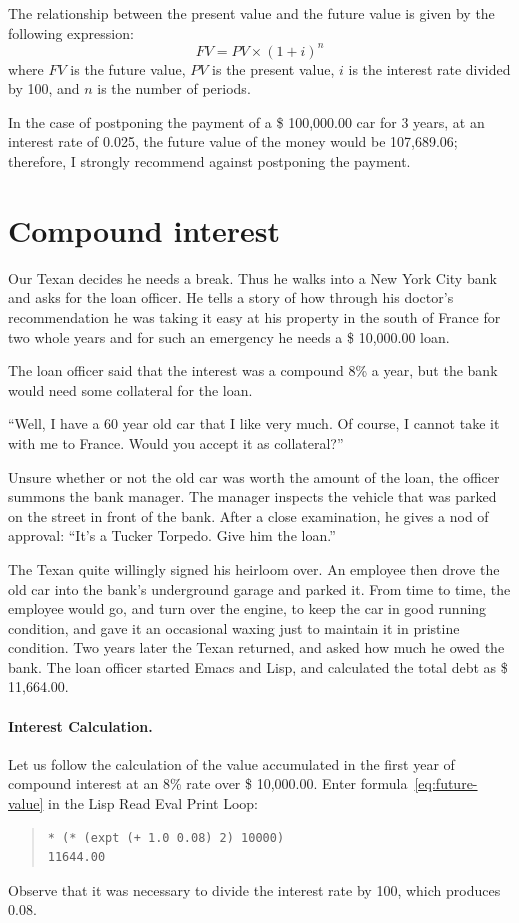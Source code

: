 \documentclass[a4paper,12pt]{book}
\begin{document}
The relationship between the present value
and the future value is given by the
following expression:
\begin{equation}
FV= PV\times (1+i)^n
\label{eq:future-value}
\end{equation}
where $FV$ is the future value, $PV$ is the present
value, $i$ is the interest rate divided by 100,
and $n$ is the number of periods.

In the case of postponing the payment of a \$ 100,000.00 car
for 3 years, at an interest rate of 0.025, the future
value of the money would be 107,689.06; therefore,
I strongly recommend against postponing the payment.

\section{Compound interest}

Our Texan decides he needs a break. Thus he walks into
a New York City bank and asks for the loan officer.
He tells a story of how through his doctor's recommendation
he was taking it easy at his property in the south of
France for two whole years and for such an 
emergency he needs a \$ 10,000.00 loan.

The loan officer said that the interest was a compound 8\%
a year, but the bank would need some collateral for the loan.

“Well, I have a 60 year old car that I like very much.
Of course, I cannot take it with me to France.
Would you accept it as collateral?”

Unsure whether or not the old car was worth the
amount of the loan, the officer summons the bank manager.
The manager inspects the vehicle that was parked on the
street in front of the bank. After a close examination,
he gives a nod of approval: “It’s a Tucker Torpedo.
Give him the loan.”

The Texan quite willingly signed his heirloom over.
An employee then drove the old car into the bank’s
underground garage and parked it. From time to time,
the employee would go, and turn over the engine, to keep
the car in good running condition, and gave it an
occasional waxing just to maintain it in pristine condition.
Two years later the Texan returned, and asked how
much he owed the bank. The loan officer started Emacs and
Lisp, and calculated the total debt as \$ 11,664.00.

\paragraph{Interest Calculation.}
Let us follow the calculation of the value accumulated
in the first year of compound interest at an 8\% rate
over \$ 10,000.00. Enter formula~\ref{eq:future-value} in
the Lisp Read Eval Print Loop:
\begin{quote}
\begin{verbatim}
* (* (expt (+ 1.0 0.08) 2) 10000)
11644.00
\end{verbatim}
\end{quote}
Observe that it was necessary to divide the
interest rate by 100, which produces 0.08.
\end{document}
